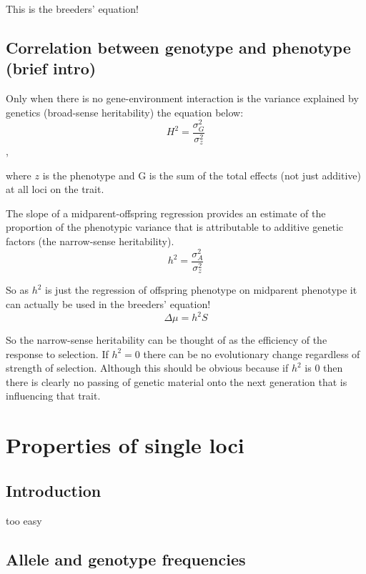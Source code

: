 \documentclass[
]{book}
\begin{document}
This is the breeders' equation!

\hypertarget{correlation-between-genotype-and-phenotype-brief-intro}{%
\section{Correlation between genotype and phenotype (brief intro)}\label{correlation-between-genotype-and-phenotype-brief-intro}}

Only when there is no gene-environment interaction is the variance explained by genetics (broad-sense heritability) the equation below:
\[H^2 = \frac{\sigma^2_G} {\sigma^2_z}\],

where \(z\) is the phenotype and G is the sum of the total effects (not just additive) at all loci on the trait.

The slope of a midparent-offspring regression provides an estimate of the proportion of the phenotypic variance that is attributable to additive genetic factors (the narrow-sense heritability).
\[h^2 = \frac{\sigma^2_A} {\sigma^2_z}\]

So as \(h^2\) is just the regression of offspring phenotype on midparent phenotype it can actually be used in the breeders' equation!
\[\Delta\mu = h^2S\]

So the narrow-sense heritability can be thought of as the efficiency of the response to selection. If \(h^2 = 0\) there can be no evolutionary change regardless of strength of selection. Although this should be obvious because if \(h^2\) is 0 then there is clearly no passing of genetic material onto the next generation that is influencing that trait.

\hypertarget{properties-of-single-loci}{%
\chapter{Properties of single loci}\label{properties-of-single-loci}}

\hypertarget{introduction}{%
\section{Introduction}\label{introduction}}

too easy

\hypertarget{allele-and-genotype-frequencies}{%
\section{Allele and genotype frequencies}\label{allele-and-genotype-frequencies}}
\end{document}
